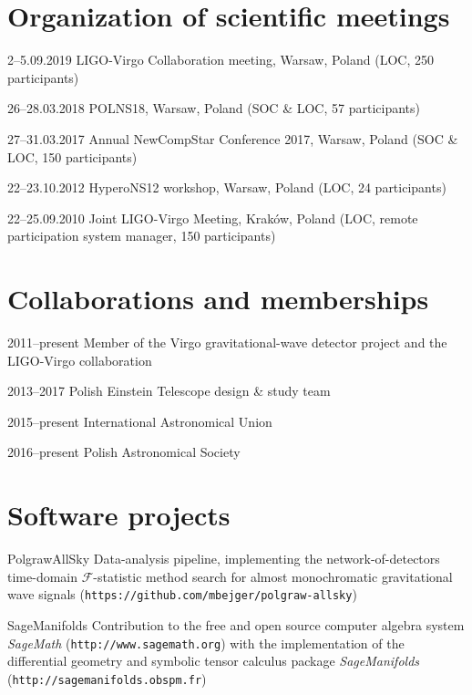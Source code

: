 \documentclass[]{friggeri-cv} %
\begin{document}
\vskip 0.5cm 
\section{Organization of scientific meetings}

\begin{entrylistshort}

\entrys
{2--5.09.2019} 
{LIGO-Virgo Collaboration meeting, Warsaw, Poland (LOC, 250 participants)} 

\entrys
{26--28.03.2018} 
{POLNS18, Warsaw, Poland (SOC \& LOC, 57 participants)} 

\entrys
{27--31.03.2017} 
{Annual NewCompStar Conference 2017, Warsaw, Poland (SOC \& LOC, 150 participants)} 
 
\entrys
{22--23.10.2012} 
{HyperoNS12 workshop, Warsaw, Poland (LOC, 24 participants)} 

\entrys 
{22--25.09.2010} 
{Joint LIGO-Virgo Meeting, Kraków, Poland (LOC, remote participation system manager, 150 participants)} 

\end{entrylistshort}


\vskip 0.5cm 
\section{Collaborations and memberships}

\begin{entrylistshort}

\entrys
{2011--present} 
{Member of the Virgo gravitational-wave detector project and the LIGO-Virgo collaboration}

\entrys
{2013--2017} 
{Polish Einstein Telescope design \& study team}

\entrys 
{2015--present}
{International Astronomical Union} 

\entrys
{2016--present}
{Polish Astronomical Society} 

\end{entrylistshort}

\pagebreak 
\section{Software projects} 

\begin{entrylistshort}

\entrys
{PolgrawAllSky} 
{Data-analysis pipeline, implementing the network-of-detectors time-domain $\mathcal{F}$-statistic method search for almost monochromatic gravitational wave signals ({\tt https://github.com/mbejger/polgraw-allsky})} 

\entrys 
{SageManifolds} 
{Contribution to the free and open source computer algebra system {\it SageMath} ({\tt http://www.sagemath.org}) with the implementation of the differential geometry and symbolic tensor calculus package {\it SageManifolds} ({\tt http://sagemanifolds.obspm.fr})}  

\end{entrylistshort}
\end{document}
